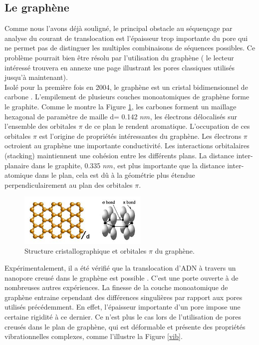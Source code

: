 \documentclass[a4paper,11pt]{article}
\begin{document}
 






\subsection{Le graphène}

Comme nous l'avons déjà souligné, le principal obstacle au séquençage par analyse du courant de translocation est l'épaisseur trop importante du pore qui ne permet pas de distinguer les multiples combinaisons de séquences possibles. Ce problème pourrait bien être résolu par l'utilisation du graphène ( le lecteur intéressé trouvera en annexe une page illustrant les pores classiques utilisés jusqu'à maintenant).\\

Isolé pour la première fois en 2004, le graphène est un cristal bidimensionnel de carbone \cite{graph}. L'empilement de plusieurs couches monoatomiques de graphène forme le graphite. Comme le montre la Figure \ref{orbit}, les carbones forment un maillage hexagonal de paramètre de maille d= 0.142 $nm$, les électrons délocalisés sur l'ensemble des orbitales $\pi$ de ce plan le rendent aromatique. L'occupation de ces orbitales $\pi$ est l'origine de propriétés intéressantes du graphène. Les électrons $\pi$ octroient au graphène une importante conductivité. Les interactions orbitalaires (stacking) maintiennent une cohésion entre les différents plans. La distance inter-planaire dans le graphite, 0.335 $nm$, est plus importante que la distance inter-atomique dans le plan, cela est dû à la géométrie plus étendue perpendiculairement au plan des orbitales $\pi$.

\begin{figure}[H]
\begin{center}
\includegraphics[width=0.55\textwidth]{orbitals2.jpg} 
\caption{Structure cristallographique et orbitales $\pi$ du graphène.}
\label{orbit}
\end{center}
\end{figure}
 
Expérimentalement, il a été vérifié que la translocation d'ADN à travers un nanopore creusé dans le graphène est possible \cite{dnatrans}. C'est une porte ouverte à de nombreuses autres expériences. La finesse de la couche monoatomique de graphène entraine cependant des différences singulières par rapport aux pores utilisés précédemment. En effet, l'épaisseur importante d'un pore impose une certaine rigidité à ce dernier. Ce n'est plus le cas lors de l'utilisation de pores creusés dans le plan de graphène, qui est déformable et présente des propriétés vibrationnelles complexes, comme l'illustre la Figure \ref{vib}.
\end{document}
